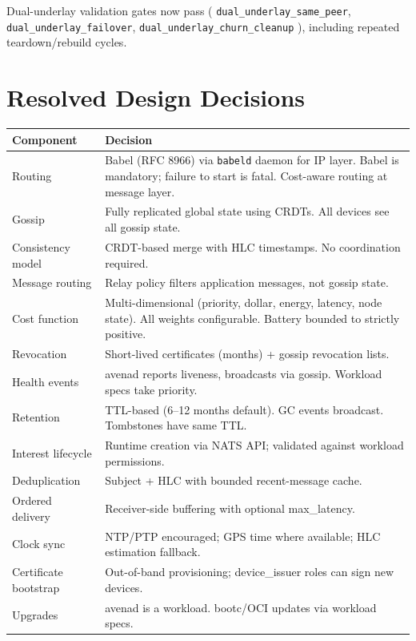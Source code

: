Dual-underlay validation gates now pass (
\texttt{dual\_underlay\_same\_peer},
\texttt{dual\_underlay\_failover},
\texttt{dual\_underlay\_churn\_cleanup}
), including repeated teardown/rebuild cycles.

\section{Resolved Design Decisions}

\begin{longtable}{@{}p{4cm}p{9cm}@{}}
\toprule
\textbf{Component} & \textbf{Decision} \\
\midrule
\endhead
Routing & Babel (RFC 8966) via \texttt{babeld} daemon for IP layer. Babel is mandatory; failure to start is fatal. Cost-aware routing at message layer. \\
Gossip & Fully replicated global state using CRDTs. All devices see all gossip state. \\
Consistency model & CRDT-based merge with HLC timestamps. No coordination required. \\
Message routing & Relay policy filters application messages, not gossip state. \\
Cost function & Multi-dimensional (priority, dollar, energy, latency, node state). All weights configurable. Battery bounded to strictly positive. \\
Revocation & Short-lived certificates (months) + gossip revocation lists. \\
Health events & avenad reports liveness, broadcasts via gossip. Workload specs take priority. \\
Retention & TTL-based (6--12 months default). GC events broadcast. Tombstones have same TTL. \\
Interest lifecycle & Runtime creation via NATS API; validated against workload permissions. \\
Deduplication & Subject + HLC with bounded recent-message cache. \\
Ordered delivery & Receiver-side buffering with optional max\_latency. \\
Clock sync & NTP/PTP encouraged; GPS time where available; HLC estimation fallback. \\
Certificate bootstrap & Out-of-band provisioning; device\_issuer roles can sign new devices. \\
Upgrades & avenad is a workload. bootc/OCI updates via workload specs. \\

\end{longtable}
